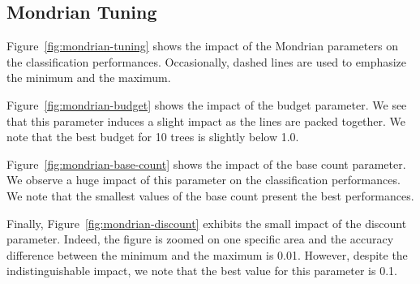 \subsection{Mondrian Tuning}
Figure~\ref{fig:mondrian-tuning} shows the impact of the Mondrian parameters on
the classification performances. Occasionally, dashed lines are used to
emphasize the minimum and the maximum.

Figure~\ref{fig:mondrian-budget} shows the impact of the budget parameter. We
see that this parameter induces a slight impact as the lines are packed
together. We note that the best budget for 10 trees is slightly below 1.0. 

Figure~\ref{fig:mondrian-base-count} shows the impact of the base count
parameter. We observe a huge impact of this parameter on the classification
performances. We note that the smallest values of the base count present the
best performances.

Finally, Figure~\ref{fig:mondrian-discount} exhibits the small impact of the
discount parameter. Indeed, the figure is zoomed on one specific area and the
accuracy difference between the minimum and the maximum is 0.01. However,
despite the indistinguishable impact, we note that the best value for this
parameter is 0.1.

